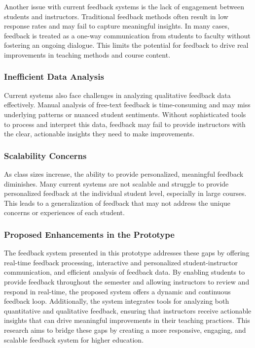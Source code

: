\documentclass[conference]{IEEEtran}
\begin{document}
Another issue with current feedback systems is the lack of engagement between students and instructors. Traditional feedback methods often result in low response rates and may fail to capture meaningful insights. In many cases, feedback is treated as a one-way communication from students to faculty without fostering an ongoing dialogue. This limits the potential for feedback to drive real improvements in teaching methods and course content.

\subsubsection{Inefficient Data Analysis}

Current systems also face challenges in analyzing qualitative feedback data effectively. Manual analysis of free-text feedback is time-consuming and may miss underlying patterns or nuanced student sentiments. Without sophisticated tools to process and interpret this data, feedback may fail to provide instructors with the clear, actionable insights they need to make improvements.

\subsubsection{Scalability Concerns}

As class sizes increase, the ability to provide personalized, meaningful feedback diminishes. Many current systems are not scalable and struggle to provide personalized feedback at the individual student level, especially in large courses. This leads to a generalization of feedback that may not address the unique concerns or experiences of each student.

\subsubsection{Proposed Enhancements in the Prototype}

The feedback system presented in this prototype addresses these gaps by offering real-time feedback processing, interactive and personalized student-instructor communication, and efficient analysis of feedback data. By enabling students to provide feedback throughout the semester and allowing instructors to review and respond in real-time, the proposed system offers a dynamic and continuous feedback loop. Additionally, the system integrates tools for analyzing both quantitative and qualitative feedback, ensuring that instructors receive actionable insights that can drive meaningful improvements in their teaching practices. This research aims to bridge these gaps by creating a more responsive, engaging, and scalable feedback system for higher education.
\end{document}
